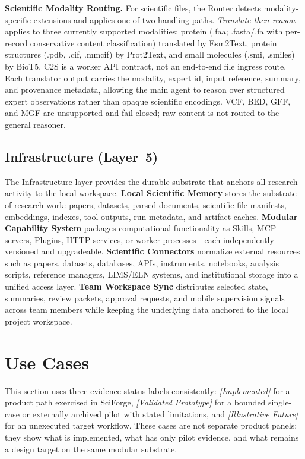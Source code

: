 \documentclass[sn-basic,Numbered,pdflatex]{sn-jnl}
\begin{document}
\textbf{Scientific Modality Routing.} For scientific files, the Router detects modality-specific extensions and applies one of two handling paths. \emph{Translate-then-reason} applies to three currently supported modalities: protein (.faa; .fasta/.fa with per-record conservative content classification) translated by Esm2Text, protein structures (.pdb, .cif, .mmcif) by Prot2Text, and small molecules (.smi, .smiles) by BioT5. C2S is a worker API contract, not an end-to-end file ingress route. Each translator output carries the modality, expert id, input reference, summary, and provenance metadata, allowing the main agent to reason over structured expert observations rather than opaque scientific encodings. VCF, BED, GFF, and MGF are unsupported and fail closed; raw content is not routed to the general reasoner.

\subsection{Infrastructure (Layer~5)}
The Infrastructure layer provides the durable substrate that anchors all research activity to the local workspace. \textbf{Local Scientific Memory} stores the substrate of research work: papers, datasets, parsed documents, scientific file manifests, embeddings, indexes, tool outputs, run metadata, and artifact caches. \textbf{Modular Capability System} packages computational functionality as Skills, MCP servers, Plugins, HTTP services, or worker processes---each independently versioned and upgradeable. \textbf{Scientific Connectors} normalize external resources such as papers, datasets, databases, APIs, instruments, notebooks, analysis scripts, reference managers, LIMS/ELN systems, and institutional storage into a unified access layer. \textbf{Team Workspace Sync} distributes selected state, summaries, review packets, approval requests, and mobile supervision signals across team members while keeping the underlying data anchored to the local project workspace.

\section{Use Cases}


This section uses three evidence-status labels consistently: \textit{[Implemented]} for a product path exercised in SciForge, \textit{[Validated Prototype]} for a bounded single-case or externally archived pilot with stated limitations, and \textit{[Illustrative Future]} for an unexecuted target workflow. These cases are not separate product panels; they show what is implemented, what has only pilot evidence, and what remains a design target on the same modular substrate.
\end{document}
